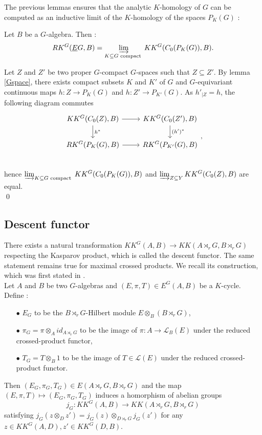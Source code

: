 The previous lemmas ensures that the analytic $K$-homology of $G$ can be computed as an inductive limit of the $K$-homology of the spaces $P_K(G)$ :
\begin{lem} Let $B$ be a $G$-algebra. Then :
\[RK^G(\underline E G,B) = \varinjlim_{K\subseteq G \text{ compact }} KK^G(C_0(P_K(G)),B).\]
\end{lem}

\begin{dem}
Let $Z$ and $Z'$ be two proper $G$-compact $G$-spaces such that $Z\subseteq Z'$. By lemma \ref{Gspace}, there exists compact subsets $K$ and $K'$ of $G$ and $G$-equivariant continuous maps $h : Z\rightarrow P_K(G)$ and $h : Z'\rightarrow P_{K'}(G)$. As $h'_{|Z} = h $, the following diagram commutes
\[\begin{tikzcd}
KK^G(C_0(Z),B)\arrow{r}\arrow{d}{h^*} & KK^G(C_0(Z'),B)\arrow{d}{(h')^*} \\
RK^G(P_{K}(G),B)\arrow{r} & RK^G(P_{K'}(G),B) \\
\end{tikzcd},\]
hence $\varinjlim_{K\subseteq G \text{ compact }} KK^G(C_0(P_K(G)),B)$ and $\varinjlim_{Z\subseteq Y} KK^G(C_0(Z),B)$ are equal.\\
\qed
\end{dem}

\subsection{Descent functor}

There exists a natural transformation $KK^G(A,B)\rightarrow KK(A\rtimes_r G, B\rtimes_r G)$ respecting the Kasparov product, which is called the descent functor. The same statement remains true for maximal crossed products. We recall its construction, which was first stated in \cite{LeGall}.\\
 
Let $A$ and $B$ be two $G$-algebras and $(E,\pi,T)\in E^G(A,B)$ be a $K$-cycle. Define :
\begin{itemize}
\item[$\bullet$] $E_G$ to be the $B\rtimes_r G$-Hilbert module $E\otimes_B (B\rtimes_r G)$,
\item[$\bullet$] $\pi_G = \pi\otimes_{A}id_{A\rtimes_r G} $ to be the image of $\pi:A \rightarrow \mathcal L_B(E)$ under the reduced crossed-product functor,
\item[$\bullet$] $T_G = T\otimes_{B}1$ to be the image of $T\in\mathcal L(E)$ under the reduced crossed-product functor.
\end{itemize}
Then $(E_G,\pi_G,T_G)\in E(A\rtimes_r G,B\rtimes_r G)$ and the map $(E,\pi,T)\mapsto (E_G,\pi_G,T_G) $ induces a homorphism of abelian groups
\[j_G : KK^G(A,B)\rightarrow KK(A\rtimes_r G,B\rtimes_r G)\]
satisfying $j_G(z\otimes_D z')=j_G(z)\otimes_{D\rtimes_r G} j_G(z')$ for any $z\in KK^G(A,D), z'\in KK^G(D,B)$.\\ 

